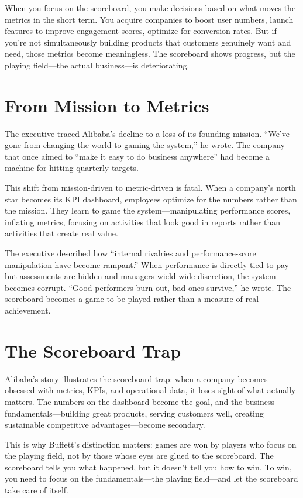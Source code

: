 When you focus on the scoreboard, you make decisions based on what moves the metrics in the short term. You acquire companies to boost user numbers, launch features to improve engagement scores, optimize for conversion rates. But if you're not simultaneously building products that customers genuinely want and need, those metrics become meaningless. The scoreboard shows progress, but the playing field—the actual business—is deteriorating.

\section{From Mission to Metrics}

The executive traced Alibaba's decline to a loss of its founding mission. ``We've gone from changing the world to gaming the system,'' he wrote. The company that once aimed to ``make it easy to do business anywhere'' had become a machine for hitting quarterly targets.

This shift from mission-driven to metric-driven is fatal. When a company's north star becomes its KPI dashboard, employees optimize for the numbers rather than the mission. They learn to game the system—manipulating performance scores, inflating metrics, focusing on activities that look good in reports rather than activities that create real value.

The executive described how ``internal rivalries and performance-score manipulation have become rampant.'' When performance is directly tied to pay but assessments are hidden and managers wield wide discretion, the system becomes corrupt. ``Good performers burn out, bad ones survive,'' he wrote. The scoreboard becomes a game to be played rather than a measure of real achievement.


\section{The Scoreboard Trap}

Alibaba's story illustrates the scoreboard trap: when a company becomes obsessed with metrics, KPIs, and operational data, it loses sight of what actually matters. The numbers on the dashboard become the goal, and the business fundamentals—building great products, serving customers well, creating sustainable competitive advantages—become secondary.

This is why Buffett's distinction matters: games are won by players who focus on the playing field, not by those whose eyes are glued to the scoreboard. The scoreboard tells you what happened, but it doesn't tell you how to win. To win, you need to focus on the fundamentals—the playing field—and let the scoreboard take care of itself.

